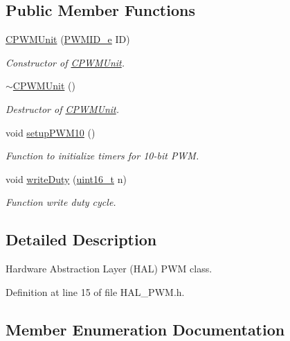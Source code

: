 \subsection*{Public Member Functions}
\begin{DoxyCompactItemize}
\item 
\mbox{\hyperlink{class_c_p_w_m_unit_a9e68713e9f26f6d36714a58648494afb}{C\+P\+W\+M\+Unit}} (\mbox{\hyperlink{class_c_p_w_m_unit_ad3e55d1df0367d8a090d4b835704be44}{P\+W\+M\+I\+D\+\_\+e}} ID)
\begin{DoxyCompactList}\small\item\em Constructor of \mbox{\hyperlink{class_c_p_w_m_unit}{C\+P\+W\+M\+Unit}}. \end{DoxyCompactList}\item 
\mbox{\hyperlink{class_c_p_w_m_unit_aabfa153a1f1019befa096147428a3822}{$\sim$\+C\+P\+W\+M\+Unit}} ()
\begin{DoxyCompactList}\small\item\em Destructor of \mbox{\hyperlink{class_c_p_w_m_unit}{C\+P\+W\+M\+Unit}}. \end{DoxyCompactList}\item 
void \mbox{\hyperlink{class_c_p_w_m_unit_aa36627883e91d3dec4a76fe187588071}{setup\+P\+W\+M10}} ()
\begin{DoxyCompactList}\small\item\em Function to initialize timers for 10-\/bit P\+WM. \end{DoxyCompactList}\item 
void \mbox{\hyperlink{class_c_p_w_m_unit_a60f8be5eabf779f57e6392a0432bf7f2}{write\+Duty}} (\mbox{\hyperlink{_a_d_a_s___types_8h_a1f1825b69244eb3ad2c7165ddc99c956}{uint16\+\_\+t}} n)
\begin{DoxyCompactList}\small\item\em Function write duty cycle. \end{DoxyCompactList}\end{DoxyCompactItemize}


\subsection{Detailed Description}
Hardware Abstraction Layer (H\+AL) P\+WM class. 

Definition at line 15 of file H\+A\+L\+\_\+\+P\+W\+M.\+h.



\subsection{Member Enumeration Documentation}
\mbox{\label{class_c_p_w_m_unit_ad3e55d1df0367d8a090d4b835704be44}} 

